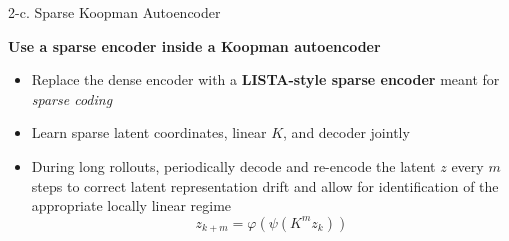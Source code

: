 \documentclass[aspectratio=169, 10pt]{beamer}
\begin{document}
\begin{frame}{2-c. Sparse Koopman Autoencoder}

\textbf{Use a sparse encoder inside a Koopman autoencoder}

\begin{center}
\end{center}

\begin{itemize}
\item Replace the dense encoder with a \textbf{LISTA-style sparse encoder} meant for \textit{sparse coding}
\item Learn sparse latent coordinates, linear $K$, and decoder jointly
\item During long rollouts, periodically decode and re-encode the latent $z$ every $m$ steps to correct latent representation drift and allow for identification of the appropriate locally linear regime \[
z_{k+m} = \varphi(\psi(K^m z_k))
\]
\end{itemize}

\end{frame}


\end{document}
